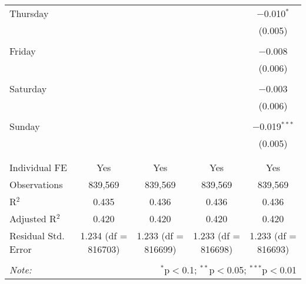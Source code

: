 \documentclass[
]{article}
\begin{document}
\begin{table}[!htbp]
{\begin{tabular}{@{\extracolsep{5pt}}lcccc}
 Thursday &  &  &  & $-$0.010$^{*}$ \\ 
  &  &  &  & (0.005) \\ 
  & & & & \\ 
 Friday &  &  &  & $-$0.008 \\ 
  &  &  &  & (0.006) \\ 
  & & & & \\ 
 Saturday &  &  &  & $-$0.003 \\ 
  &  &  &  & (0.006) \\ 
  & & & & \\ 
 Sunday &  &  &  & $-$0.019$^{***}$ \\ 
  &  &  &  & (0.005) \\ 
  & & & & \\ 
\hline \\[-1.8ex] 
Individual FE & Yes & Yes & Yes & Yes \\ 
Observations & 839,569 & 839,569 & 839,569 & 839,569 \\ 
R$^{2}$ & 0.435 & 0.436 & 0.436 & 0.436 \\ 
Adjusted R$^{2}$ & 0.420 & 0.420 & 0.420 & 0.420 \\ 
Residual Std. Error & 1.234 (df = 816703) & 1.233 (df = 816699) & 1.233 (df = 816698) & 1.233 (df = 816693) \\ 
\hline 
\hline \\[-1.8ex] 
\textit{Note:}  & \multicolumn{4}{r}{$^{*}$p$<$0.1; $^{**}$p$<$0.05; $^{***}$p$<$0.01} \\ 
\end{tabular}
} 
\end{table} 
\newpage
\end{document}

